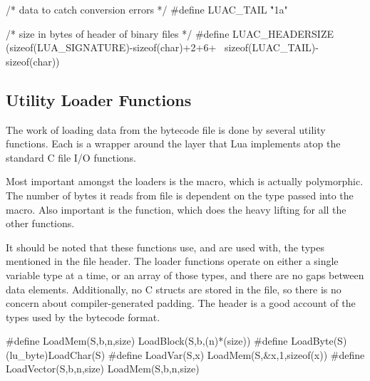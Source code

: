 
\begin{LuaCCode}[caption=Definition of \keyword{LUAC\_TAIL} from \filename{lundump.h}]
/* data to catch conversion errors */
#define LUAC_TAIL		"\r\n\x1a\n"
\end{LuaCCode}


\begin{LuaCCode}[breaklines=true,caption=Definition of \keyword{LUAC\_HEADERSIZE} from \filename{lundump.h}]
/* size in bytes of header of binary files */
#define LUAC_HEADERSIZE		(sizeof(LUA_SIGNATURE)-sizeof(char)+2+6+ \
	sizeof(LUAC_TAIL)-sizeof(char))
\end{LuaCCode}


\subsection{Utility Loader Functions}

	The work of loading data from the bytecode file is done by several
	utility functions.  Each is a wrapper around the \func{ZIO} layer that
	Lua implements atop the standard C file I/O functions.

	Most important amongst the loaders is the  macro, which
	is actually polymorphic.  The number of bytes it reads from file is
	dependent on the type passed into the macro.  Also important is the
	\func{LoadBlock} function, which does the heavy lifting for all the
	other functions.

	It should be noted that these functions use, and are used with, the
	types mentioned in the file header.  The loader functions operate on
	either a single variable type at a time, or an array of those types,
	and there are no gaps between data elements.  Additionally, no C
	structs are stored in the file, so there is no concern about
	compiler-generated padding.  The header is a good account of the types
	used by the bytecode format.


\begin{LuaCCode}[tabsize=8,caption=Definition of shorthand macros from \filename{lundump.c}]
#define LoadMem(S,b,n,size)	LoadBlock(S,b,(n)*(size))
#define LoadByte(S)		(lu_byte)LoadChar(S)
#define LoadVar(S,x)		LoadMem(S,&x,1,sizeof(x))
#define LoadVector(S,b,n,size)	LoadMem(S,b,n,size)
\end{LuaCCode}

